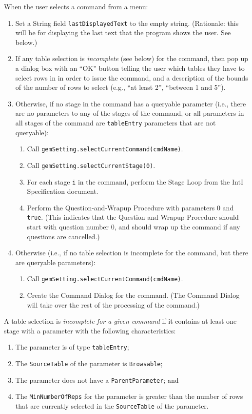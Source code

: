\documentclass[11pt]{article}
\begin{document}
When the user selects a command from a menu:
\begin{enumerate}
\item Set a String field {\tt lastDisplayedText} to the empty string.
  (Rationale:  this will be for displaying the last text that the program
  shows the user.  See below.)
\item If any table selection is {\it incomplete} (see below) for the command,
  then pop up a dialog box with an ``OK'' button telling the user
  which tables they have to select rows in in order to issue the
  command, and a description of the bounds of the number of rows to
  select (e.g., ``at least 2'', ``between 1 and 5'').
\item Otherwise, if no stage in the command has a queryable parameter
  (i.e., there are no parameters to any of the stages of the command, or all
  parameters in all stages of the command are
  {\tt tableEntry} parameters that are not queryable):
  \begin{enumerate}
  \item Call {\tt gemSetting.selectCurrentCommand(cmdName)}.
  \item Call {\tt gemSetting.selectCurrentStage(0)}.
  \item For each stage \verb/i/ in the command, perform the Stage Loop
    from the IntI Specification document.
  \item Perform the Question-and-Wrapup Procedure with parameters 0 and
    {\tt true}.  (This indicates that the Question-and-Wrapup
    Procedure should start with question number 0, and should wrap up
    the command if any questions are cancelled.)
  \end{enumerate}
\item Otherwise (i.e., if no table selection is incomplete for
  the command, but there are queryable parameters):
  \begin{enumerate}
  \item Call {\tt gemSetting.selectCurrentCommand(cmdName)}.
  \item Create the Command Dialog for the command.
    (The Command Dialog will take over the rest of the processing
    of the command.)
  \end{enumerate}
\end{enumerate}
A table selection is {\it incomplete for a given command}
if it contains at least one stage with a parameter with the following
characteristics:
\begin{enumerate}
\item The parameter is of type {\tt tableEntry};
\item The {\tt SourceTable} of the parameter is {\tt Browsable};
\item The parameter does not have a {\tt ParentParameter}; and
\item The {\tt MinNumberOfReps} for the parameter is greater than the
  number of rows that are currently selected in the {\tt SourceTable} of the
  parameter.
\end{enumerate}
\end{document}
